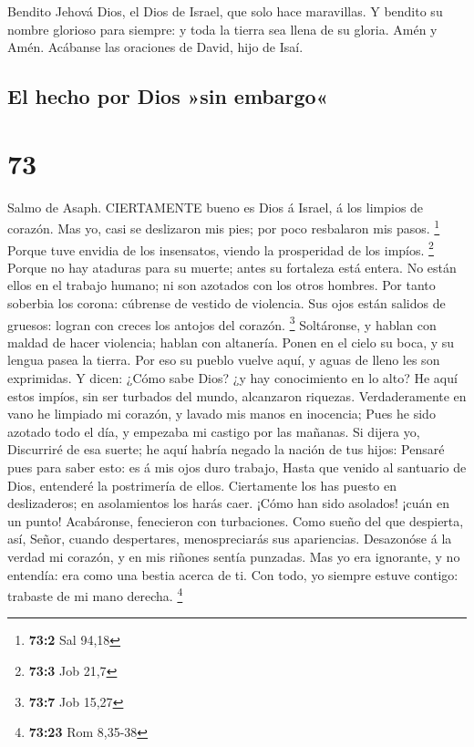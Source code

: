  Bendito Jehová Dios, el Dios de Israel, que solo hace
maravillas.  Y bendito su nombre glorioso para siempre: y
toda la tierra sea llena de su gloria. Amén y Amén. 
Acábanse las oraciones de David, hijo de Isaí.

\hypertarget{el-hecho-por-dios-sin-embargo}{%
\subsection{El hecho por Dios »sin
embargo«}\label{el-hecho-por-dios-sin-embargo}}

\hypertarget{section-72}{%
\section{73}\label{section-72}}

 Salmo de Asaph. CIERTAMENTE bueno es Dios á Israel, á los
limpios de corazón.  Mas yo, casi se deslizaron mis pies;
por poco resbalaron mis pasos. \footnote{\textbf{73:2} Sal 94,18}
 Porque tuve envidia de los insensatos, viendo la
prosperidad de los impíos. \footnote{\textbf{73:3} Job 21,7}
 Porque no hay ataduras para su muerte; antes su fortaleza
está entera.  No están ellos en el trabajo humano; ni son
azotados con los otros hombres.  Por tanto soberbia los
corona: cúbrense de vestido de violencia.  Sus ojos están
salidos de gruesos: logran con creces los antojos del corazón.
\footnote{\textbf{73:7} Job 15,27}  Soltáronse, y hablan con
maldad de hacer violencia; hablan con altanería.  Ponen en
el cielo su boca, y su lengua pasea la tierra.  Por eso su
pueblo vuelve aquí, y aguas de lleno les son exprimidas.  Y
dicen: ¿Cómo sabe Dios? ¿y hay conocimiento en lo alto?  He
aquí estos impíos, sin ser turbados del mundo, alcanzaron riquezas.
 Verdaderamente en vano he limpiado mi corazón, y lavado
mis manos en inocencia;  Pues he sido azotado todo el día,
y empezaba mi castigo por las mañanas.  Si dijera yo,
Discurriré de esa suerte; he aquí habría negado la nación de tus hijos:
 Pensaré pues para saber esto: es á mis ojos duro trabajo,
 Hasta que venido al santuario de Dios, entenderé la
postrimería de ellos.  Ciertamente los has puesto en
deslizaderos; en asolamientos los harás caer.  ¡Cómo han
sido asolados! ¡cuán en un punto! Acabáronse, fenecieron con
turbaciones.  Como sueño del que despierta, así, Señor,
cuando despertares, menospreciarás sus apariencias. 
Desazonóse á la verdad mi corazón, y en mis riñones sentía punzadas.
 Mas yo era ignorante, y no entendía: era como una bestia
acerca de ti.  Con todo, yo siempre estuve contigo:
trabaste de mi mano derecha. \footnote{\textbf{73:23} Rom 8,35-38}

